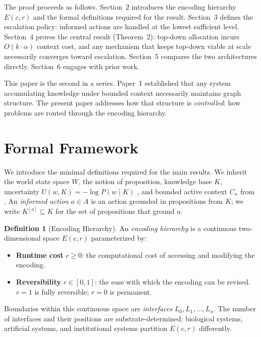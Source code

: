 \documentclass[11pt]{article}
\theoremstyle{definition}
\newtheorem{definition}{Definition}
\begin{document}
The proof proceeds as follows. Section~2 introduces the encoding
hierarchy $E(c,r)$ and the formal definitions required for the result.
Section~3 defines the escalation policy: informed
actions are handled at the lowest sufficient level. Section~4 proves
the central result (Theorem~2): top-down allocation incurs $O(k
\cdot \alpha)$ context cost, and any mechanism that keeps top-down
viable at scale necessarily converges toward escalation. Section~5
compares the two architectures directly. Section~6 engages with prior
work.

This paper is the second in a series. Paper~1 \cite{McCarthy2026a}
established that any system accumulating knowledge under bounded
context necessarily maintains graph structure. The present paper
addresses how that structure is \emph{controlled}: how problems are
routed through the encoding hierarchy.

\section{Formal Framework}
\label{sec:framework}

We introduce the minimal definitions required for the main results.
We inherit the world state space $W$, the notion of proposition, knowledge base $K$,
uncertainty $U(w,K) = -\log P(w \mid K)$ \cite{Cover2006}, and bounded
active context $C_n$ from \cite{McCarthy2026a}. An \emph{informed
action} $a \in A$ is an action grounded in propositions from $K$; we
write $K^{[a]} \subseteq K$ for the set of propositions that ground $a$.

\begin{definition}[Encoding Hierarchy]
\label{def:hierarchy}
An \emph{encoding hierarchy} is a continuous two-dimensional space
$E(c,r)$ parameterized by:
\begin{itemize}
\item \textbf{Runtime cost} $c \geq 0$: the computational cost of
   accessing and modifying the encoding.
\item \textbf{Reversibility} $r \in [0,1]$: the ease with which the
   encoding can be revised. $r = 1$ is fully reversible; $r = 0$ is
   permanent.
\end{itemize}

Boundaries within this continuous space are \emph{interfaces}
$L_0, L_1, \ldots, L_n$. The number of interfaces and their positions
are substrate-determined: biological systems, artificial systems, and
institutional systems partition $E(c,r)$ differently.
\end{definition}
\end{document}

